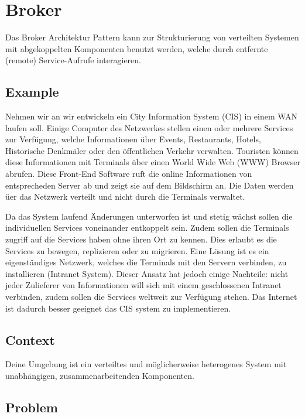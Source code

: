 \section{Broker}


Das Broker Architektur Pattern kann zur Strukturierung von verteilten Systemen mit abgekoppelten Komponenten benutzt werden, welche durch entfernte (remote) Service-Aufrufe interagieren.

\subsection*{Example}


Nehmen wir an wir entwickeln ein City Information System (CIS) in einem WAN laufen soll. Einige Computer des Netzwerkes stellen einen oder mehrere Services zur Verfügung, welche Informationen über Events, Restaurants, Hotels, Historische Denkmäler oder den öffentlichen Verkehr verwalten. Touristen können diese Informationen mit Terminals über einen World Wide Web (WWW) Browser abrufen. Diese Front-End Software ruft die online Informationen von entsprecheden Server ab und zeigt sie auf dem Bildschirm an. Die Daten werden üer das Netzwerk verteilt und nicht durch die Terminals verwaltet.

Da das System laufend Änderungen unterworfen ist und stetig wächst sollen die individuellen Services voneinander entkoppelt sein. Zudem sollen die Terminals zugriff auf die Services haben ohne ihren Ort zu kennen. Dies erlaubt es die Services zu bewegen, replizieren oder zu migrieren. Eine Lösung ist es ein eigenständiges Netzwerk, welches die Terminals mit den Servern verbinden, zu installieren (Intranet System). Dieser Ansatz hat jedoch einige Nachteile: nicht jeder Zulieferer von Informationen will sich mit einem geschlossenen Intranet verbinden, zudem sollen die Services weltweit zur Verfügung stehen. Das Internet ist dadurch besser geeignet das CIS system zu implementieren.

\subsection*{Context}


Deine Umgebung ist ein verteiltes und möglicherweise heterogenes System mit unabhängigen, zusammenarbeitenden Komponenten.

\subsection*{Problem}


